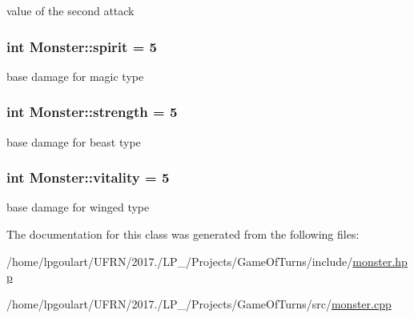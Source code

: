 value of the second attack 

\subsubsection[{\texorpdfstring{spirit}{spirit}}]{\setlength{\rightskip}{0pt plus 5cm}int Monster\+::spirit = 5\hspace{0.3cm}{\ttfamily [protected]}}\hypertarget{classMonster_aa1b8da71fd1003628cee59bb8f52f270}{}\label{classMonster_aa1b8da71fd1003628cee59bb8f52f270}


base damage for magic type 

\subsubsection[{\texorpdfstring{strength}{strength}}]{\setlength{\rightskip}{0pt plus 5cm}int Monster\+::strength = 5\hspace{0.3cm}{\ttfamily [protected]}}\hypertarget{classMonster_afbc16b4a4bf61323209aea1b5a49e696}{}\label{classMonster_afbc16b4a4bf61323209aea1b5a49e696}


base damage for beast type 

\subsubsection[{\texorpdfstring{vitality}{vitality}}]{\setlength{\rightskip}{0pt plus 5cm}int Monster\+::vitality = 5\hspace{0.3cm}{\ttfamily [protected]}}\hypertarget{classMonster_a30645db1b638fc2c158720519c0bf645}{}\label{classMonster_a30645db1b638fc2c158720519c0bf645}


base damage for winged type 



The documentation for this class was generated from the following files\+:\begin{DoxyCompactItemize}
\item 
/home/lpgoulart/\+U\+F\+R\+N/2017./\+L\+P\+\_/\+Projects/\+Game\+Of\+Turns/include/\hyperlink{monster_8hpp}{monster.\+hpp}\item 
/home/lpgoulart/\+U\+F\+R\+N/2017./\+L\+P\+\_/\+Projects/\+Game\+Of\+Turns/src/\hyperlink{monster_8cpp}{monster.\+cpp}\end{DoxyCompactItemize}
